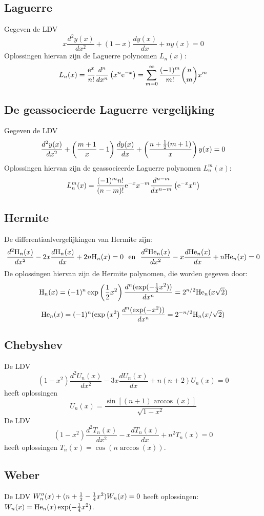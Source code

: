 \subsection{Laguerre}
Gegeven de LDV
\[
x\frac{d^2y(x)}{dx^2}+(1-x)\frac{dy(x)}{dx}+ny(x)=0
\]
Oplossingen hiervan zijn de Laguerre polynomen $L_n(x)$:
\[
L_n(x)=\frac{{\rm e}^x}{n!}\frac{d^n}{dx^n}\left(x^n{\rm e}^{-x}\right)=
\sum_{m=0}^\infty\frac{(-1)^m}{m!}{n\choose m}x^m
\]

\subsection{De geassocieerde Laguerre vergelijking}
Gegeven de LDV
\[
\frac{d^2y(x)}{dx^2}+\left(\frac{m+1}{x}-1\right)\frac{dy(x)}{dx}+\left(\frac{n+\mbox{$\frac{1}{2}$}(m+1)}{x}\right)y(x)=0
\]
Oplossingen hiervan zijn de geassocieerde Laguerre polynomen $L_n^m(x)$:
\[
L_n^m(x)=\frac{(-1)^mn!}{(n-m)!}{\rm e}^{-x}x^{-m}\frac{d^{n-m}}{dx^{n-m}}\left({\rm e}^{-x}x^n\right)
\]

\subsection{Hermite}
\def\Hn{{\rm H}_n}
\def\Hen{{\rm He}_n}
De differentiaalvergelijkingen van Hermite zijn:
\[
\frac{d^2\Hn(x)}{dx^2}-2x\frac{d\Hn(x)}{dx}+2n\Hn(x)=0~~\mbox{en}~~
\frac{d^2\Hen(x)}{dx^2}-x\frac{d\Hen(x)}{dx}+n\Hen(x)=0
\]
De oplossingen hiervan zijn de Hermite polynomen, die worden gegeven door:
\[
\Hn(x)=(-1)^n\exp\left(\frac{1}{2}x^2\right)\frac{d^n(\exp(-\half x^2))}{dx^n}=2^{n/2}\Hen(x\sqrt{2})
\]
\[
\Hen(x)=(-1)^n(\exp\left(x^2\right)\frac{d^n(\exp(-x^2))}{dx^n}=2^{-n/2}\Hn(x/\sqrt{2})
\]

\subsection{Chebyshev}
De LDV
\[
(1-x^2)\frac{d^2U_n(x)}{dx^2}-3x\frac{dU_n(x)}{dx}+n(n+2)U_n(x)=0
\]
heeft oplossingen
\[
U_n(x)=\frac{\sin[(n+1)\arccos(x)]}{\sqrt{1-x^2}}
\]
De LDV
\[
(1-x^2)\frac{d^2T_n(x)}{dx^2}-x\frac{dT_n(x)}{dx}+n^2T_n(x)=0
\]
heeft oplossingen $T_n(x)=\cos(n\arccos(x))$.

\subsection{Weber}
De LDV $W''_n(x)+(n+\mbox{$\frac{1}{2}$}-\mbox{$\frac{1}{4}$} x^2)W_n(x)=0$ heeft oplossingen:
$W_n(x)={\rm He}_n(x)\exp(-\mbox{$\frac{1}{4}$} x^2)$.

